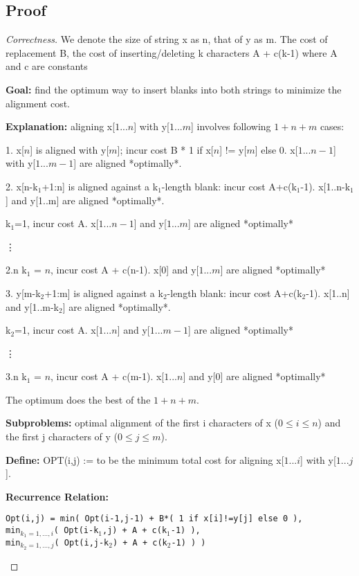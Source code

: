 \documentclass[openany]{article}
\begin{document}
\subsection*{Proof}
\begin{proof}[Correctness]{}
    We denote the size of string x as n, that of y as m. The cost of replacement B, the cost of inserting/deleting k characters A + c(k-1) where A and c are constants

    \textbf{Goal:} find the optimum way to insert blanks into both strings to minimize the alignment cost.
    
    \textbf{Explanation:} aligning x[$1...n$] with y[$1...m$] involves following $1+n+m$ cases:
    
    1. x[$n$] is aligned with y[$m$]; incur cost B * 1 if x[$n$] != y[$m$] else 0. x[$1...n-1$] with y[$1...m-1$] are aligned *optimally*.
    
    2. x[n-k$_1$+1:n] is aligned against a k$_1$-length blank: incur cost A+c(k$_1$-1). x[1..n-k$_1$] and y[1..m] are aligned *optimally*.
    
         k$_1$=1, incur cost A. x[$1...n-1$] and y[$1...m$] are aligned *optimally*
        
        \qquad \vdots
        
        \qquad 2.n k$_1$ = $n$, incur cost A + c(n-1). x[0] and y[$1...m$] are aligned *optimally*
    
3. y[m-k$_2$+1:m] is aligned against a k$_2$-length blank: incur cost A+c(k$_2$-1). x[1..n] and y[1..m-k$_2$] are aligned *optimally*.

         k$_2$=1, incur cost A. x[$1...n$] and y[$1...m-1$] are aligned *optimally*
        
        \qquad \vdots
        
        \qquad 3.n k$_1$ = $n$, incur cost A + c(m-1). x[$1...n$] and y[0] are aligned *optimally*

The optimum does the best of the $1+n+m$.

    \textbf{Subproblems:} optimal alignment of the first i characters of x ($0 \leq i \leq n$) and the first j characters of y ($0 \leq j \leq m$).
    
    \textbf{Define:} OPT(i,j) := to be the minimum total cost for aligning x[$1...i$] with y[$1...j$].
    
    \textbf{Recurrence Relation:} 
    \begin{center}
        \texttt{Opt(i,j) = min(  Opt(i-1,j-1) + B*( 1 if x[i]!=y[j] else 0 ),\\
        min$_{k_1=1,...,i}$( Opt(i-k$_1$,j) + A + c(k$_1$-1) ),\\
        min$_{k_2=1,...,j}$( Opt(i,j-k$_2$) + A + c(k$_2$-1) )  )}
    \end{center}
    

\end{proof}
\end{document}
